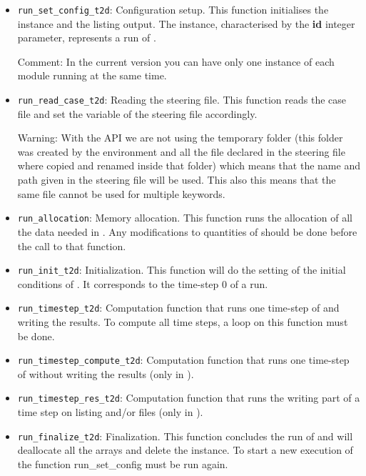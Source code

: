 \begin{itemize}
\item \verb!run_set_config_t2d!: Configuration setup. This function initialises
  the instance and the listing output. The instance, characterised by the
  \textbf{id} integer parameter, represents a run of .

\begin{CommentBlock}{Comment:}
\centering
  In the current version you can have only one instance of each module running
  at the same time.
\end{CommentBlock}

\item \verb!run_read_case_t2d!: Reading the  steering file. This
  function reads the case file and set the variable of the 
    steering file accordingly.

\begin{WarningBlock}{Warning:}
\centering
  With the API we are not using the temporary folder (this folder was created
  by the \python{} environment and all the file declared in the steering file
  where copied and renamed inside that folder) which means that the name and
  path given in the steering file will be used. This also this means that the
  same file cannot be used for multiple keywords.
\end{WarningBlock}

\item \verb!run_allocation!: Memory allocation. This function runs the
  allocation of all the data needed in . Any modifications to
    quantities of  should be done before the call to that function.

\item \verb!run_init_t2d!: Initialization. This function will do the setting of
  the initial conditions of . It corresponds to the time-step 0 of
    a  run.

\item \verb!run_timestep_t2d!: Computation function that runs one time-step
  of  and writing the results. To compute all time steps, a
    loop on this function must be done.

\item \verb!run_timestep_compute_t2d!: Computation function that runs one
  time-step of  without writing the results (only in ).

\item \verb!run_timestep_res_t2d!: Computation function that runs the writing
  part of a time step on listing and/or files (only in ).

\item \verb!run_finalize_t2d!: Finalization. This function concludes the run of
   and will deallocate all the arrays and delete the instance. To
    start a new execution of  the function run\_set\_config must be
    run again.

\end{itemize}

